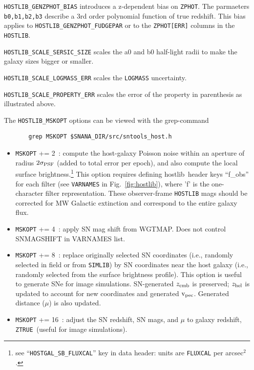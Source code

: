 \documentclass[12pt]{article}
\newcommand{\unc}{uncertainty}
\newcommand{\hostlib}{{\sc hostlib}}
\newcommand{\zhelio}{z_{\rm hel}}
\newcommand{\zcmb}{z_{\rm cmb}}
\newcommand{\vpec}{{\rm v}_{\rm pec}}
\newcommand{\ztrue}{{\tt ZTRUE}}
\begin{document}
{{\tt HOSTLIB\_GENZPHOT\_BIAS} introduces a z-dependent bias on {\tt ZPHOT}.
The parmaeters {\tt b0,b1,b2,b3} describe a 3rd order polynomial function
of true redshift. This bias applies to {\tt HOSTLIB\_GENZPHOT\_FUDGEPAR} 
or to the {\tt ZPHOT[ERR]} columns in the {\tt HOSTLIB}.

{\tt HOSTLIB\_SCALE\_SERSIC\_SIZE} scales the a0 and b0 half-light radii
to make the galaxy sizes bigger or smaller.

{\tt HOSTLIB\_SCALE\_LOGMASS\_ERR} scales the {\tt LOGMASS} \unc.

{\tt HOSTLIB\_SCALE\_PROPERTY\_ERR} scales the error of the property in parenthesis as illustrated above.

The {\tt HOSTLIB\_MSKOPT} options can be 
viewed with the grep-command
\begin{verbatim}
       grep MSKOPT $SNANA_DIR/src/sntools_host.h 
\end{verbatim}
%
\begin{itemize}
  \itemsep0em 
\item {\tt MSKOPT} += 2~: compute the host-galaxy Poisson noise within
       an aperture of radius $2\sigma_{\rm PSF}$ 
       (added to total error per epoch), and also compute
       the local surface brightness.\footnote{see 
         ``{\tt HOSTGAL\_SB\_FLUXCAL}'' key in data header: 
         units are {\tt FLUXCAL} per arcsec$^2$.}
       This option requires defining \hostlib\ header keys
       ``f\_obs'' for each filter 
       (see {\tt VARNAMES} in Fig.~\ref{fig:hostlib}), 
       where 'f' is the one-character filter representation.
       These observer-frame {\tt HOSTLIB} mags should be corrected for 
       MW Galactic extinction and correspond to the entire galaxy flux.
%
\item {\tt MSKOPT} += 4~: apply SN mag shift from WGTMAP.
      Does not control SNMAGSHIFT in VARNAMES list.
%
\item {\tt MSKOPT} += 8~: replace originally selected SN coordinates 
      (i.e., randomly selected in field or from {\tt SIMLIB})
      by SN coordinates near the host galaxy 
      (i.e., randomly selected from the surface brightness profile).
      This option is useful to generate SNe for image simulations.
      SN-generated $\zcmb$ is preserved; $\zhelio$ is updated to
      account for new coordinates and generated $\vpec$. 
      Generated distance ($\mu$) is also updated.
%
\item {\tt MSKOPT} += 16~: adjust the SN redshift, SN mags, and $\mu$ 
      to galaxy redshift, \ztrue\  (useful for image simulations).

\end{itemize}}
\end{document}
